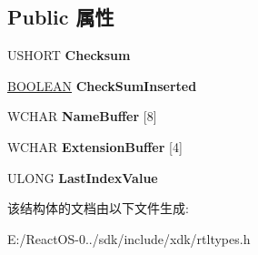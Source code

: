 \subsection*{Public 属性}
\begin{DoxyCompactItemize}
\item 
\mbox{\label{struct___g_e_n_e_r_a_t_e___n_a_m_e___c_o_n_t_e_x_t_ae842cdba5e0991cffe2d5a1d95ff5c5d}} 
U\+S\+H\+O\+RT {\bfseries Checksum}
\item 
\mbox{\label{struct___g_e_n_e_r_a_t_e___n_a_m_e___c_o_n_t_e_x_t_a51c0db6a0ebc6a02393b259891bbd6a7}} 
\hyperlink{_processor_bind_8h_a112e3146cb38b6ee95e64d85842e380a}{B\+O\+O\+L\+E\+AN} {\bfseries Check\+Sum\+Inserted}
\item 
\mbox{\label{struct___g_e_n_e_r_a_t_e___n_a_m_e___c_o_n_t_e_x_t_a18a2dbcd711ec03a7933f7d4b3a475b2}} 
W\+C\+H\+AR {\bfseries Name\+Buffer} \mbox{[}8\mbox{]}
\item 
\mbox{\label{struct___g_e_n_e_r_a_t_e___n_a_m_e___c_o_n_t_e_x_t_a7e5d68cc61a366934ee59aa0a364aa65}} 
W\+C\+H\+AR {\bfseries Extension\+Buffer} \mbox{[}4\mbox{]}
\item 
\mbox{\label{struct___g_e_n_e_r_a_t_e___n_a_m_e___c_o_n_t_e_x_t_adad1c9179f76b50c74ce111a0db10012}} 
U\+L\+O\+NG {\bfseries Last\+Index\+Value}
\end{DoxyCompactItemize}


该结构体的文档由以下文件生成\+:\begin{DoxyCompactItemize}
\item 
E\+:/\+React\+O\+S-\/0../sdk/include/xdk/rtltypes.\+h\end{DoxyCompactItemize}
